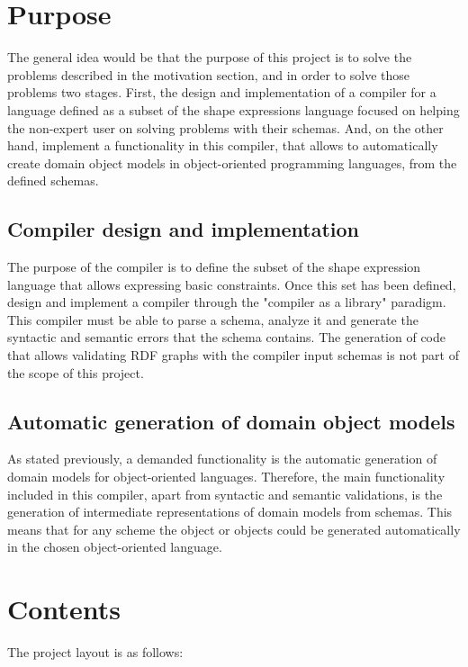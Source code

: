 \section{Purpose}
The general idea would be that the purpose of this project is to solve the problems described in the motivation section, and in order to solve those problems two stages.
First, the design and implementation of a compiler for a language defined as a subset of the shape expressions language focused on helping the non-expert user on solving problems with their schemas. And, on the other hand, implement a functionality in this compiler, that allows to automatically create domain object models in object-oriented programming languages, from the defined schemas.

\subsection{Compiler design and implementation}
The purpose of the compiler is to define the subset of the shape expression language that allows expressing basic constraints. Once this set has been defined, design and implement a compiler through the "compiler as a library" paradigm.
This compiler must be able to parse a schema, analyze it and generate the syntactic and semantic errors that the schema contains. The generation of code that allows validating RDF graphs with the compiler input schemas is not part of the scope of this project.

\subsection{Automatic generation of domain object models}
As stated previously, a demanded functionality is the automatic generation of domain models for object-oriented languages. Therefore, the main functionality included in this compiler, apart from syntactic and semantic validations, is the generation of intermediate representations of domain models from schemas. This means that for any scheme the object or objects could be generated automatically in the chosen object-oriented language.

\section{Contents}
The project layout is as follows:\\

